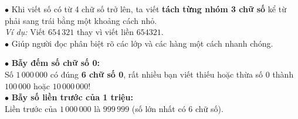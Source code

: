 \documentclass[14pt,a4paper,oneside]{extbook}
\begin{document}
\noindent
\begin{minipage}[t]{0.54\textwidth}
  \begin{tcolorbox}[
    enhanced,
    title={\footnotesize\bfseries\color{white}\faFont\ Quy tắc viết số lớn chống nhầm lẫn},
    colback=green!3!white,
    colframe=green!60!black,
    arc=2.5mm, boxrule=0.8pt, top=1.8mm, bottom=1.8mm, left=2.2mm, right=2.2mm
  ]
    \footnotesize
    $\bullet$ Khi viết số có từ 4 chữ số trở lên, ta viết \textbf{tách từng nhóm 3 chữ số} kể từ phải sang trái bằng một khoảng cách nhỏ.\\
    \textit{Ví dụ:} Viết $654\,321$ thay vì viết liền $654321$.\\
    $\bullet$ Giúp người đọc phân biệt rõ các lớp và các hàng một cách nhanh chóng.
  \end{tcolorbox}
\end{minipage}%
\hfill
\begin{minipage}[t]{0.44\textwidth}
  \begin{tcolorbox}[
    enhanced,
    title={\footnotesize\bfseries\color{white}\faExclamationTriangle\ Mẹo tránh bẫy trắc nghiệm},
    colback=red!2!white,
    colframe=red!70!black,
    arc=2.5mm, boxrule=0.8pt, top=1.8mm, bottom=1.8mm, left=2.2mm, right=2.2mm
  ]
    \footnotesize
    $\bullet$ \textbf{Bẫy đếm số chữ số 0:}\\
    Số $1\,000\,000$ có đúng \textbf{6 chữ số 0}, rất nhiều bạn viết thiếu hoặc thừa số 0 thành $100\,000$ hoặc $10\,000\,000$!\\
    $\bullet$ \textbf{Bẫy số liền trước của 1 triệu:}\\
    Liền trước của $1\,000\,000$ là $999\,999$ (số lớn nhất có 6 chữ số).
  \end{tcolorbox}
\end{minipage}
\end{document}
